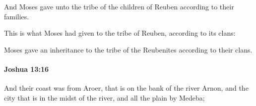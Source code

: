 			\begin{versebox}
					\item[BHS] 
					\item[ASV] And Moses gave unto the tribe of the children of Reuben according to their families.
					\item[NIV] This is what Moses had given to the tribe of Reuben, according to its clans:
					\item[NRSV] Moses gave an inheritance to the tribe of the Reubenites according to their clans.
			\end{versebox}

		\paragraph{Joshua 13:16} %
			\label{JOSHUA-13-16}

			And their coast was from Aroer, that is on the bank of the river Arnon, and the city that is in the midst of the river, and all the plain by Medeba;

